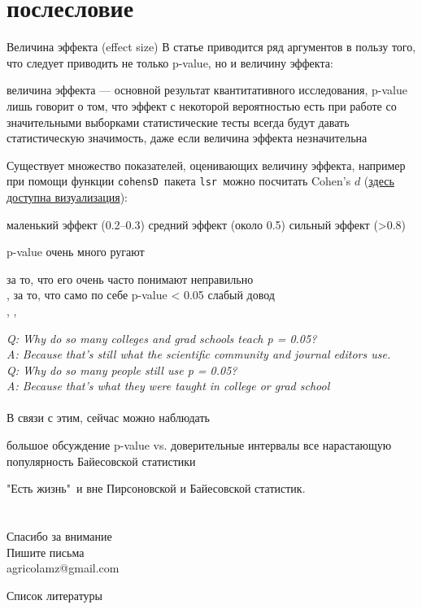 \section{послесловие}
\begin{frame}{Величина эффекта (effect size)}
В статье \citep{sullivan12} приводится ряд аргументов в пользу того, что следует приводить не только p-value, но и величину эффекта:
\begin{itemize}
\mytem величина эффекта —  основной результат квантитативного исследования, p-value лишь говорит о том, что эффект с некоторой вероятностью есть
\mytem при работе со значительными выборками статистические тесты всегда будут давать статистическую значимость, даже если величина эффекта незначительна
\end{itemize}
Существует множество показателей, оценивающих величину эффекта, например при помощи функции \scriptsize\verb"cohensD"\normalsize\ пакета \scriptsize\verb"lsr"\normalsize\ можно посчитать Cohen’s $d$ (\href{http://rpsychologist.com/d3/cohend/}{\alert{здесь доступна визуализация}}):
\begin{itemize}
\mytem маленький эффект (0.2–0.3)
\mytem средний эффект (около 0.5)
\mytem сильный эффект (>0.8)
\end{itemize}
\end{frame}
\begin{frame}{p-value очень много ругают}
\begin{itemize}
\mytem за то, что его очень часто понимают неправильно\\ \citep{gigerenzer04}, \citep{goodman08}
\mytem за то, что само по себе p-value < 0.05 слабый довод\\ \citep{sterne01}, \citep{nuzzo14}, \citep{wasserstein16}
\end{itemize}
\vfill
\small
\textit{Q: Why do so many colleges and grad schools teach p = 0.05?\\
A: Because that's still what the scientific community and journal editors use.\medskip\\
Q: Why do so many people still use p = 0.05?\\
A: Because that's what they were taught in college or grad school}\\\hfill
\normalsize \citep{wasserstein16}\\
\vfill
В связи с этим, сейчас можно наблюдать
\begin{itemize}
\mytem большое обсуждение p-value vs. доверительные интервалы
\mytem  все нарастающую популярность Байесовской статистики
 \end{itemize}
\vfill
"Есть жизнь"\ и вне Пирсоновской и Байесовской статистик.
\end{frame}
\section{}
\begin{frame}
{\huge Спасибо за внимание\bigskip\\
\normalsize Пишите письма\\
agricolamz@gmail.com
\vspace{-130pt}}
\end{frame}
\begin{frame}{Список литературы}
\footnotesize


\end{frame}
